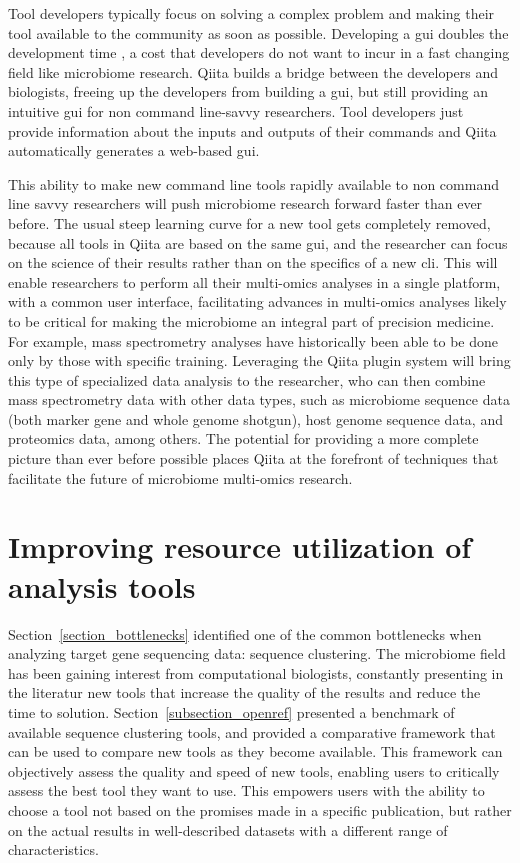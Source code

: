 Tool developers typically focus on solving a complex problem and making their
tool available to the community as soon as possible. Developing a \gls{gui} doubles
the development time \cite{Myers1992}, a cost that developers do not want to incur
in a fast changing field like microbiome research. Qiita builds a bridge between
the developers and biologists, freeing up the developers from building a \gls{gui},
but still providing an intuitive \gls{gui} for non command line-savvy researchers.
Tool developers just provide information about the inputs and outputs of their
commands and Qiita automatically generates a web-based \gls{gui}.

This ability to make new command line tools rapidly available to non command line
savvy researchers will push microbiome research forward faster than ever before.
The usual steep learning curve for a new tool gets completely removed, because all
tools in Qiita are based on the same \gls{gui}, and the researcher can focus on
the science of their results rather than on the specifics of a new \gls{cli}.
This will enable researchers to perform all their multi-omics analyses in a
single platform, with a common user interface, facilitating advances in
multi-omics analyses likely to be critical for making the microbiome an integral
part of precision medicine. For example, mass spectrometry analyses have
historically been able to be done only by those with specific training.
Leveraging the Qiita plugin system will bring this type of specialized data analysis
to the researcher, who can then combine mass spectrometry data with other data types,
such as microbiome sequence data (both marker gene and whole genome shotgun), host
genome sequence data, and proteomics data, among others. The potential for
providing a more complete picture than ever before possible places Qiita at the
forefront of techniques that facilitate the future of microbiome multi-omics research.

\section{Improving resource utilization of analysis tools}
Section~\ref{section_bottlenecks} identified one of the common bottlenecks when
analyzing target gene sequencing data: sequence clustering. The microbiome field
has been gaining interest from computational biologists, constantly presenting in
the literatur new tools that increase the quality of the results and reduce the
time to solution. Section~\ref{subsection_openref} presented a benchmark of
available sequence clustering tools, and provided a comparative framework
that can be used to compare new tools as they become available. This framework can
objectively assess the quality and speed of new tools, enabling users to
critically assess the best tool they want to use. This empowers users with the
ability to choose a tool not based on the promises made in a specific publication,
but rather on the actual results in well-described datasets with a different range of
characteristics.

